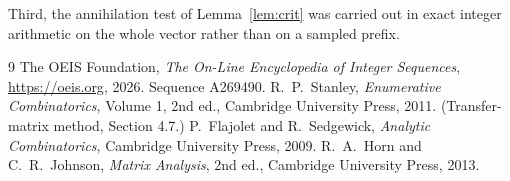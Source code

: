 \documentclass[11pt,a4paper]{article}
\theoremstyle{plain}
\theoremstyle{definition}
\begin{document}
Third, the annihilation test of Lemma~\ref{lem:crit} was carried out in exact integer
arithmetic on the whole vector rather than on a sampled prefix.

\begin{thebibliography}{9}
 The OEIS Foundation, \emph{The On-Line Encyclopedia of Integer
Sequences}, \url{https://oeis.org}, 2026. Sequence A269490.
 R.~P.~Stanley, \emph{Enumerative Combinatorics}, Volume 1, 2nd ed.,
Cambridge University Press, 2011. (Transfer-matrix method, Section 4.7.)
 P.~Flajolet and R.~Sedgewick, \emph{Analytic Combinatorics}, Cambridge
University Press, 2009.
 R.~A.~Horn and C.~R.~Johnson, \emph{Matrix Analysis}, 2nd ed., Cambridge
University Press, 2013.
\end{thebibliography}
\end{document}
